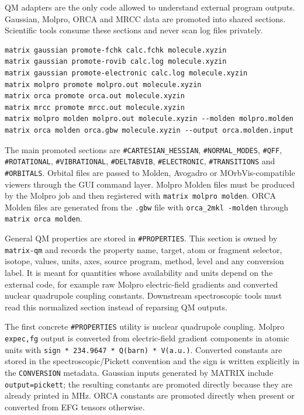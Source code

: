 \documentclass[11pt]{article}
\newcommand{\sectionname}[1]{\texttt{\##1}}
\begin{document}
QM adapters are the only code allowed to understand external program outputs.
Gaussian, Molpro, ORCA and MRCC data are promoted into shared sections.
Scientific tools consume these sections and never scan log files privately.

\begin{lstlisting}[style=matrix]
matrix gaussian promote-fchk calc.fchk molecule.xyzin
matrix gaussian promote-rovib calc.log molecule.xyzin
matrix gaussian promote-electronic calc.log molecule.xyzin
matrix molpro promote molpro.out molecule.xyzin
matrix orca promote orca.out molecule.xyzin
matrix mrcc promote mrcc.out molecule.xyzin
matrix molpro molden molpro.out molecule.xyzin --molden molpro.molden
matrix orca molden orca.gbw molecule.xyzin --output orca.molden.input
\end{lstlisting}

The main promoted sections are \sectionname{CARTESIAN\_HESSIAN},
\sectionname{NORMAL\_MODES}, \sectionname{QFF}, \sectionname{ROTATIONAL},
\sectionname{VIBRATIONAL}, \sectionname{DELTABVIB},
\sectionname{ELECTRONIC}, \sectionname{TRANSITIONS} and
\sectionname{ORBITALS}.  Orbital files are passed to Molden, Avogadro or
MOrbVis-compatible viewers through the GUI command layer.  Molpro Molden files
must be produced by the Molpro job and then registered with
\texttt{matrix molpro molden}.  ORCA Molden files are generated from the
\texttt{.gbw} file with \texttt{orca\_2mkl -molden} through
\texttt{matrix orca molden}.

General QM properties are stored in \sectionname{PROPERTIES}.  This section is
owned by \texttt{matrix-qm} and records the property name, target, atom or
fragment selector, isotope, values, units, axes, source program, method, level
and any conversion label.  It is meant for quantities whose availability and
units depend on the external code, for example raw Molpro electric-field
gradients and converted nuclear quadrupole coupling constants.  Downstream
spectroscopic tools must read this normalized section instead of reparsing QM
outputs.

The first concrete \sectionname{PROPERTIES} utility is nuclear quadrupole
coupling.  Molpro \texttt{expec,fg} output is converted from electric-field
gradient components in atomic units with
\texttt{sign * 234.9647 * Q(barn) * V(a.u.)}.  Converted constants are stored
in the spectroscopic/Pickett convention and the sign is written explicitly in
the \texttt{CONVERSION} metadata.  Gaussian inputs generated by MATRIX include
\texttt{output=pickett}; the resulting constants are promoted directly because
they are already printed in MHz.  ORCA constants are promoted directly when
present or converted from EFG tensors otherwise.
\end{document}
